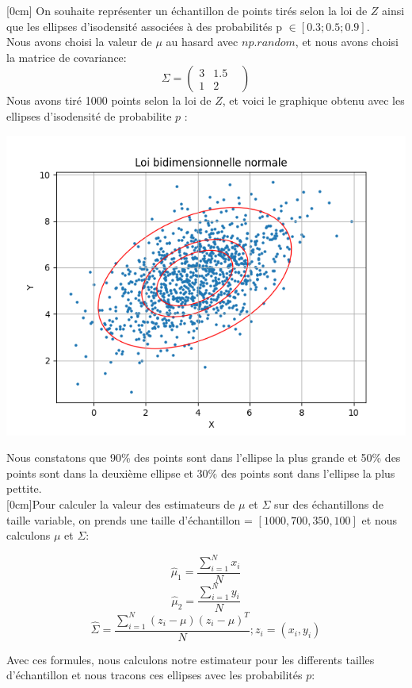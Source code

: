 \documentclass{article}
\begin{document}
\reversemarginpar{}[0cm]
On souhaite représenter un échantillon de points tirés selon la loi de $Z$ ainsi que les ellipses d'isodensité
associées à des probabilités p $\in [0.3;0.5;0.9]$. 
$$$$
Nous avons choisi la valeur de $\mu$ au hasard avec $np.random$, et nous avons choisi la matrice de covariance:
\[
\Sigma = \begin{pmatrix} 3 &1.5  &\\ 1 &2 \end{pmatrix} 
\]
Nous avons tiré 1000 points selon la loi de $Z$, et voici le graphique obtenu avec les ellipses d'isodensité de probabilite $p$ :

\includegraphics[width=\textwidth]{Figure_1.png}

Nous constatons que 90\% des points sont dans l'ellipse la plus grande et 50\% des points sont dans la deuxième ellipse et 30\% des points sont dans l'ellipse la plus pettite.
$$$$
\reversemarginpar{}[0cm]Pour calculer la valeur des estimateurs de $\mu$ et $\Sigma$ sur des échantillons de taille variable, on prends une taille d'échantillon = 
$[1000,700,350,100]$ et nous calculons $\mu$ et $\Sigma$:

$$\hat{\mu}_1= \frac{\sum_{i=1}^{N}x_i}{N}$$
$$\hat{\mu}_2 = \frac{\sum_{i=1}^{N}y_i}{N}$$
$$\hat{\Sigma}=\frac{\sum_{i=1}^{N}(z_i-\mu)(z_i-\mu)^{T}}{N} ; z_i = (x_i,y_i)$$

Avec ces formules, nous calculons notre estimateur pour les differents tailles d'échantillon et nous tracons ces ellipses avec les probabilités $p$:
\end{document}
